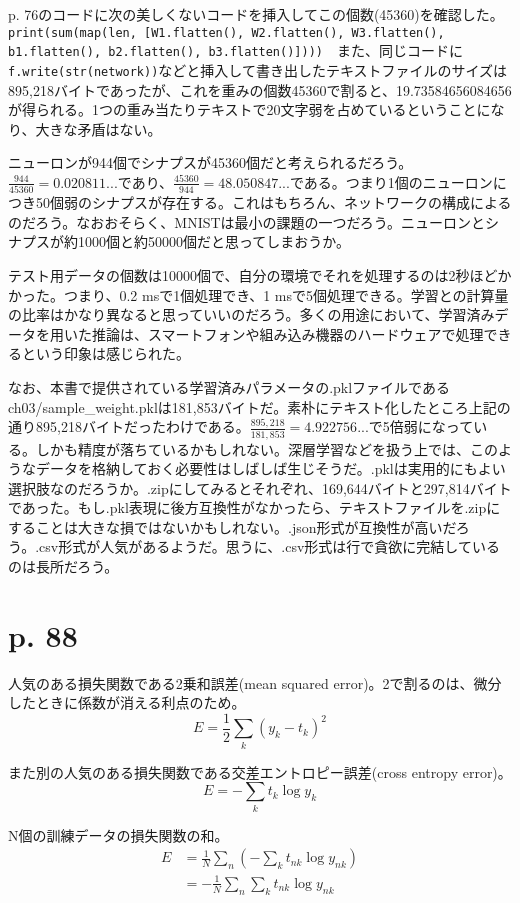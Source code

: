 \documentclass[uplatex,dvipdfmx]{jsarticle} \usepackage{amsmath,amssymb,bm}
\begin{document}
p. 76のコードに次の美しくないコードを挿入してこの個数(45360)を確認した。{\tt print(sum(map(len, [W1.flatten(), W2.flatten(), W3.flatten(), b1.flatten(), b2.flatten(), b3.flatten()])))}　また、同じコードに{\tt f.write(str(network))}などと挿入して書き出したテキストファイルのサイズは895,218バイトであったが、これを重みの個数45360で割ると、19.73584656084656が得られる。1つの重み当たりテキストで20文字弱を占めているということになり、大きな矛盾はない。

ニューロンが944個でシナプスが45360個だと考えられるだろう。$\frac{944}{45360}=0.020811...$であり、$\frac{45360}{944}=48.050847...$である。つまり1個のニューロンにつき50個弱のシナプスが存在する。これはもちろん、ネットワークの構成によるのだろう。なおおそらく、MNISTは最小の課題の一つだろう。ニューロンとシナプスが約1000個と約50000個だと思ってしまおうか。

テスト用データの個数は10000個で、自分の環境でそれを処理するのは2秒ほどかかった。つまり、0.2 msで1個処理でき、1 msで5個処理できる。学習との計算量の比率はかなり異なると思っていいのだろう。多くの用途において、学習済みデータを用いた推論は、スマートフォンや組み込み機器のハードウェアで処理できるという印象は感じられた。

なお、本書で提供されている学習済みパラメータの.pklファイルであるch03/sample\_weight.pklは181,853バイトだ。素朴にテキスト化したところ上記の通り895,218バイトだったわけである。$\frac{895,218}{181,853}=4.922756...$で5倍弱になっている。しかも精度が落ちているかもしれない。深層学習などを扱う上では、このようなデータを格納しておく必要性はしばしば生じそうだ。.pklは実用的にもよい選択肢なのだろうか。.zipにしてみるとそれぞれ、169,644バイトと297,814バイトであった。もし.pkl表現に後方互換性がなかったら、テキストファイルを.zipにすることは大きな損ではないかもしれない。.json形式が互換性が高いだろう。.csv形式が人気があるようだ。思うに、.csv形式は行で貪欲に完結しているのは長所だろう。

\section*{p. 88}
人気のある損失関数である2乗和誤差(mean squared error)。2で割るのは、微分したときに係数が消える利点のため。
$$E=\frac12\sum_k (y_k-t_k)^2$$

また別の人気のある損失関数である交差エントロピー誤差(cross entropy error)。
$$E=-\sum_k t_k \log y_k$$

N個の訓練データの損失関数の和。
\begin{align*}
E &=\frac1N\sum_n \left( -\sum_k t_{nk} \log y_{nk} \right) \\
&=-\frac1N\sum_n\sum_k t_{nk}\log y_{nk}
\end{align*}
\end{document}
